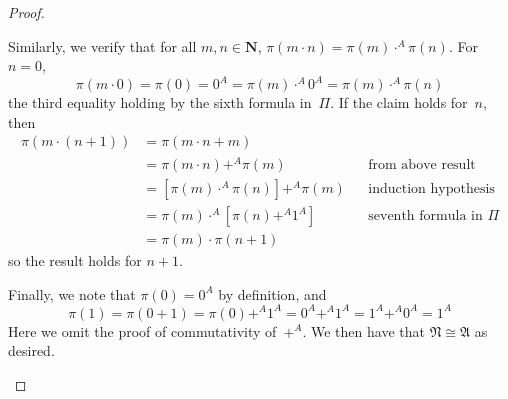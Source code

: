 \documentclass[letterpaper]{article}
\newcommand{\N}{\mathbf{N}}
\newcommand{\iso}{\cong}
\theoremstyle{remark}
\begin{document}
\begin{proof}
\begin{enumerate}
Similarly, we verify that for all $m,n\in\N$, $\pi(m\cdot n)=\pi(m)\cdot^A\pi(n)$. For $n=0$,
$$\pi(m\cdot0)=\pi(0)=0^A=\pi(m)\cdot^A0^A=\pi(m)\cdot^A\pi(n)$$
the third equality holding by the sixth formula in~$\Pi$. If the claim holds for~$n$, then
\begin{align*}
\pi(m\cdot(n+1))&=\pi(m\cdot n+m)&&\\
                &=\pi(m\cdot n)+^A\pi(m)&&\text{from above result}\\
                &=[\pi(m)\cdot^A\pi(n)]+^A\pi(m)&&\text{induction hypothesis}\\
                &=\pi(m)\cdot^A[\pi(n)+^A1^A]&&\text{seventh formula in~$\Pi$}\\
                &=\pi(m)\cdot\pi(n+1)
\end{align*}
so the result holds for $n+1$.

Finally, we note that $\pi(0)=0^A$ by definition, and
$$\pi(1)=\pi(0+1)=\pi(0)+^A1^A=0^A+^A1^A=1^A+^A0^A=1^A$$
Here we omit the proof of commutativity of~$+^A$. We then have that $\mathfrak{N}\iso\mathfrak{A}$ as desired.
\end{enumerate}
\end{proof}
\end{document}
